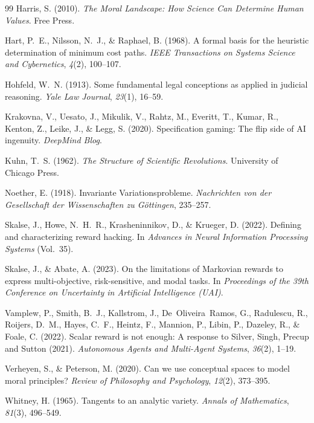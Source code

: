 \documentclass[12pt]{article}
\theoremstyle{definition}
\theoremstyle{remark}
\begin{document}
\begin{thebibliography}{99}
Harris, S. (2010). \textit{The Moral Landscape: How Science Can Determine Human Values}. Free Press.

Hart, P.~E., Nilsson, N.~J., \& Raphael, B. (1968). A formal basis for the heuristic determination of minimum cost paths. \textit{IEEE Transactions on Systems Science and Cybernetics}, \textit{4}(2), 100--107.

Hohfeld, W.~N. (1913). Some fundamental legal conceptions as applied in judicial reasoning. \textit{Yale Law Journal}, \textit{23}(1), 16--59.

Krakovna, V., Uesato, J., Mikulik, V., Rahtz, M., Everitt, T., Kumar, R., Kenton, Z., Leike, J., \& Legg, S. (2020). Specification gaming: The flip side of AI ingenuity. \textit{DeepMind Blog}.

Kuhn, T.~S. (1962). \textit{The Structure of Scientific Revolutions}. University of Chicago Press.

Noether, E. (1918). Invariante Variationsprobleme. \textit{Nachrichten von der Gesellschaft der Wissenschaften zu G\"{o}ttingen}, 235--257.

Skalse, J., Howe, N.~H.~R., Krasheninnikov, D., \& Krueger, D. (2022). Defining and characterizing reward hacking. In \textit{Advances in Neural Information Processing Systems} (Vol.~35).

Skalse, J., \& Abate, A. (2023). On the limitations of Markovian rewards to express multi-objective, risk-sensitive, and modal tasks. In \textit{Proceedings of the 39th Conference on Uncertainty in Artificial Intelligence (UAI)}.

Vamplew, P., Smith, B.~J., Kallstrom, J., De~Oliveira~Ramos, G., Radulescu, R., Roijers, D.~M., Hayes, C.~F., Heintz, F., Mannion, P., Libin, P., Dazeley, R., \& Foale, C. (2022). Scalar reward is not enough: A response to Silver, Singh, Precup and Sutton (2021). \textit{Autonomous Agents and Multi-Agent Systems}, \textit{36}(2), 1--19.

Verheyen, S., \& Peterson, M. (2020). Can we use conceptual spaces to model moral principles? \textit{Review of Philosophy and Psychology}, \textit{12}(2), 373--395.

Whitney, H. (1965). Tangents to an analytic variety. \textit{Annals of Mathematics}, \textit{81}(3), 496--549.

\end{thebibliography}
\end{document}
